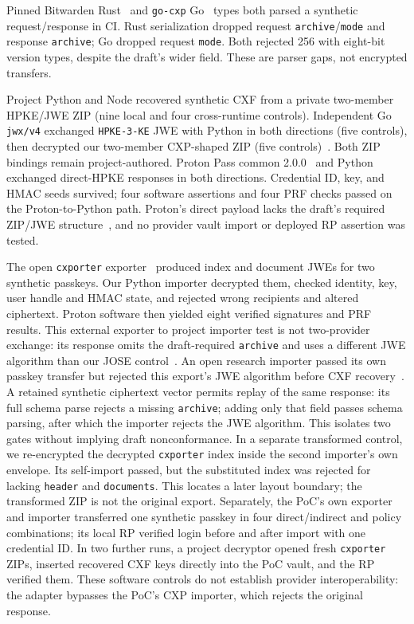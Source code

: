 \documentclass[letterpaper,twocolumn,10pt]{article}
\begin{document}
Pinned Bitwarden Rust~\cite{bitwardencxp} and \texttt{go-cxp}
Go~\cite{gocxp} types both parsed a synthetic request/response in CI.
Rust serialization dropped request \texttt{archive}/\texttt{mode} and
response \texttt{archive}; Go dropped request \texttt{mode}. Both rejected
256 with eight-bit version types, despite the draft's wider field. These
are parser gaps, not encrypted transfers.

Project Python and Node recovered synthetic CXF from a private two-member
HPKE/JWE ZIP (nine local and four cross-runtime controls). Independent Go
\texttt{jwx/v4} exchanged \texttt{HPKE-3-KE} JWE with Python in both
directions (five controls), then decrypted our two-member CXP-shaped ZIP
(five controls)~\cite{josehpke,jwx}. Both ZIP bindings remain
project-authored. Proton Pass common 2.0.0~\cite{proton} and Python
exchanged direct-HPKE responses in both directions. Credential ID, key,
and HMAC seeds survived; four software assertions and four PRF checks
passed on the Proton-to-Python path. Proton's direct payload lacks the
draft's required ZIP/JWE structure~\cite{cxp}, and no provider vault
import or deployed RP assertion was tested.

The open \texttt{cxporter} exporter~\cite{cxporter} produced index and
document JWEs for two synthetic passkeys. Our Python importer decrypted
them, checked identity, key, user handle and HMAC state, and rejected wrong
recipients and altered ciphertext. Proton software then yielded eight
verified signatures and PRF results. This external exporter to project
importer test is not two-provider exchange: its response omits the
draft-required \texttt{archive} and uses a different JWE algorithm than
our JOSE control~\cite{cxp}.
An open research importer passed its own passkey transfer but rejected
this export's JWE algorithm before CXF recovery~\cite{cxppoc}.
A retained synthetic ciphertext vector permits replay of the same response:
its full schema parse rejects a missing \texttt{archive}; adding only that
field passes schema parsing, after which the importer rejects the JWE
algorithm. This isolates two gates without implying draft nonconformance.
In a separate transformed control, we re-encrypted the decrypted
\texttt{cxporter} index inside the second importer's own envelope. Its
self-import passed, but the substituted index was rejected for lacking
\texttt{header} and \texttt{documents}. This locates a later layout boundary;
the transformed ZIP is not the original export.
Separately, the PoC's own exporter and importer transferred one synthetic
passkey in four direct/indirect and policy combinations; its local RP
verified login before and after import with one credential ID. In two
further runs, a project decryptor opened fresh \texttt{cxporter} ZIPs,
inserted recovered CXF keys directly into the PoC vault, and the RP
verified them. These software controls do not establish provider
interoperability: the adapter bypasses the PoC's CXP importer, which
rejects the original response.
\end{document}
